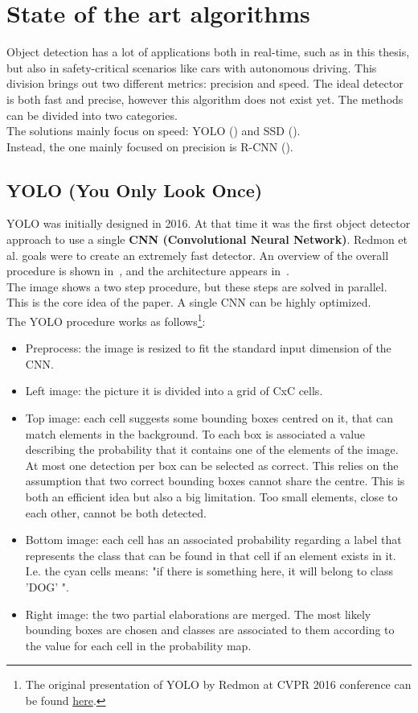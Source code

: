 \section{State of the art algorithms}
Object detection has a lot of applications both in real-time, such as in this thesis, but also in safety-critical scenarios like cars with autonomous driving. This division brings out two different metrics: precision and speed. The ideal detector is both fast and precise, however this algorithm does not exist yet. The methods can be divided into two categories.\\
The solutions mainly focus on speed: YOLO () and SSD ().\\
Instead, the one mainly focused on precision is R-CNN ().


\subsection{YOLO (You Only Look Once)} \label{sec:yolo}
YOLO\cite{yolo} was initially designed in 2016. At that time it was the first object detector approach to use a single \textbf{CNN (Convolutional Neural Network)}. Redmon et al. goals were to create an extremely fast detector. An overview of the overall procedure is shown in~, and the architecture appears in~.\\
The image shows a two step procedure, but these steps are solved in parallel. This is the core idea of the paper. A single CNN can be highly optimized.\\
The YOLO procedure works as follows\footnote{The original presentation of YOLO by Redmon at CVPR 2016 conference can be found \href{https://www.youtube.com/watch?v=NM6lrxy0bxs}{here}.}:
\begin{itemize}
	\item Preprocess: the image is resized to fit the standard input dimension of the CNN.
	\item Left image: the picture it is divided into a grid of CxC cells.
	\item Top image: each cell suggests some bounding boxes centred on it, that can match elements in the background. To each box is associated a value describing the probability that it contains one of the elements of the image.\\
	At most one detection per box can be selected as correct. This relies on the assumption that two correct bounding boxes cannot share the centre. This is both an efficient idea but also a big limitation. Too small elements, close to each other, cannot be both detected.
	\item Bottom image: each cell has an associated probability regarding a label that represents the class that can be found in that cell if an element exists in it.\\
	I.e. the cyan cells means: "if there is something here, it will belong to class 'DOG' ".
	\item Right image: the two partial elaborations are merged. The most likely bounding boxes are chosen and classes are associated to them according to the value for each cell in the probability map.
\end{itemize}
